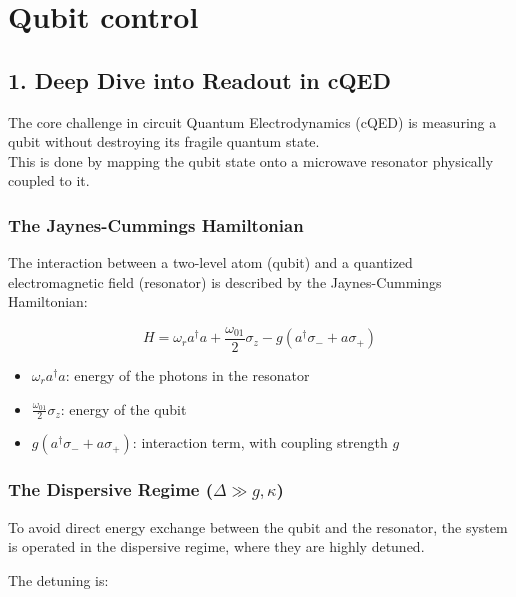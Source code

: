 \documentclass[
]{article}
\providecommand{\tightlist}{%
  \setlength{\itemsep}{0pt}\setlength{\parskip}{0pt}}
\begin{document}
\section{Qubit control}\label{qubit-control}

\subsection{1. Deep Dive into Readout in
cQED}\label{deep-dive-into-readout-in-cqed}

The core challenge in circuit Quantum Electrodynamics (cQED) is
measuring a qubit without destroying its fragile quantum state.\\
This is done by mapping the qubit state onto a microwave resonator
physically coupled to it.

\subsubsection{The Jaynes-Cummings
Hamiltonian}\label{the-jaynes-cummings-hamiltonian}

The interaction between a two-level atom (qubit) and a quantized
electromagnetic field (resonator) is described by the Jaynes-Cummings
Hamiltonian:

\[
H = \omega_r a^\dagger a + \frac{\omega_{01}}{2}\sigma_z - g\left(a^\dagger \sigma_- + a \sigma_+\right)
\]

\begin{itemize}
\tightlist
\item
  \(\omega_r a^\dagger a\): energy of the photons in the resonator
\item
  \(\frac{\omega_{01}}{2}\sigma_z\): energy of the qubit
\item
  \(g(a^\dagger \sigma_- + a \sigma_+)\): interaction term, with
  coupling strength \(g\)
\end{itemize}

\subsubsection{\texorpdfstring{The Dispersive Regime
(\(\Delta \gg g, \kappa\))}{The Dispersive Regime (\textbackslash Delta \textbackslash gg g, \textbackslash kappa)}}\label{the-dispersive-regime-delta-gg-g-kappa}

To avoid direct energy exchange between the qubit and the resonator, the
system is operated in the dispersive regime, where they are highly
detuned.

The detuning is:
\end{document}
